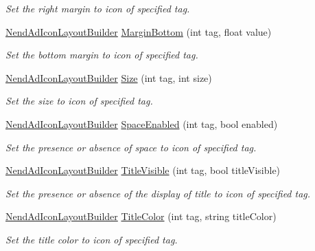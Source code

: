 \begin{DoxyCompactItemize}
\begin{DoxyCompactList}\small\item\em Set the right margin to icon of specified tag. \end{DoxyCompactList}\item 
\hyperlink{class_nend_unity_plugin_1_1_layout_1_1_nend_ad_icon_layout_builder}{Nend\+Ad\+Icon\+Layout\+Builder} \hyperlink{class_nend_unity_plugin_1_1_layout_1_1_nend_ad_icon_layout_builder_a97098e92c76ce7008baaa5a2a14417de}{Margin\+Bottom} (int tag, float value)
\begin{DoxyCompactList}\small\item\em Set the bottom margin to icon of specified tag. \end{DoxyCompactList}\item 
\hyperlink{class_nend_unity_plugin_1_1_layout_1_1_nend_ad_icon_layout_builder}{Nend\+Ad\+Icon\+Layout\+Builder} \hyperlink{class_nend_unity_plugin_1_1_layout_1_1_nend_ad_icon_layout_builder_ad55b76f91635a184f017ee4aa905a71a}{Size} (int tag, int size)
\begin{DoxyCompactList}\small\item\em Set the size to icon of specified tag. \end{DoxyCompactList}\item 
\hyperlink{class_nend_unity_plugin_1_1_layout_1_1_nend_ad_icon_layout_builder}{Nend\+Ad\+Icon\+Layout\+Builder} \hyperlink{class_nend_unity_plugin_1_1_layout_1_1_nend_ad_icon_layout_builder_a53facd9a92591d867c74dcb02582d1f9}{Space\+Enabled} (int tag, bool enabled)
\begin{DoxyCompactList}\small\item\em Set the presence or absence of space to icon of specified tag. \end{DoxyCompactList}\item 
\hyperlink{class_nend_unity_plugin_1_1_layout_1_1_nend_ad_icon_layout_builder}{Nend\+Ad\+Icon\+Layout\+Builder} \hyperlink{class_nend_unity_plugin_1_1_layout_1_1_nend_ad_icon_layout_builder_aa15805d08993f3f031cb8faf68382337}{Title\+Visible} (int tag, bool title\+Visible)
\begin{DoxyCompactList}\small\item\em Set the presence or absence of the display of title to icon of specified tag. \end{DoxyCompactList}\item 
\hyperlink{class_nend_unity_plugin_1_1_layout_1_1_nend_ad_icon_layout_builder}{Nend\+Ad\+Icon\+Layout\+Builder} \hyperlink{class_nend_unity_plugin_1_1_layout_1_1_nend_ad_icon_layout_builder_a18b12503f26843daa0f65719c9df5b12}{Title\+Color} (int tag, string title\+Color)
\begin{DoxyCompactList}\small\item\em Set the title color to icon of specified tag. \end{DoxyCompactList}\end{DoxyCompactItemize}


